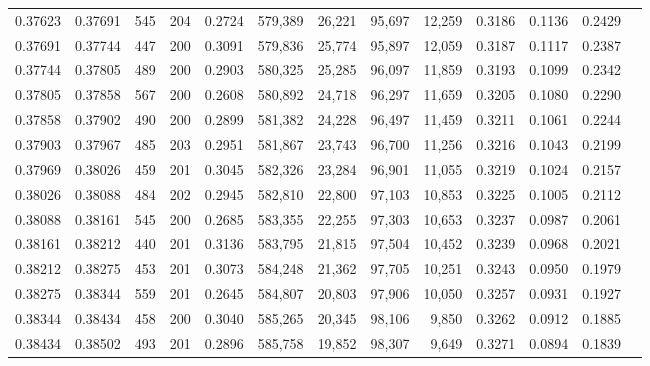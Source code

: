 \begin{tabular}{rrrrrrrrrrrrr}
0.37623 & 0.37691 &   545 & 204 &                                     0.2724 & 579,389 &  26,221 &  95,697 &  12,259 & 0.3186 & 0.1136 & 0.2429 \\
0.37691 & 0.37744 &   447 & 200 &                                     0.3091 & 579,836 &  25,774 &  95,897 &  12,059 & 0.3187 & 0.1117 & 0.2387 \\
0.37744 & 0.37805 &   489 & 200 &                                     0.2903 & 580,325 &  25,285 &  96,097 &  11,859 & 0.3193 & 0.1099 & 0.2342 \\
0.37805 & 0.37858 &   567 & 200 &                                     0.2608 & 580,892 &  24,718 &  96,297 &  11,659 & 0.3205 & 0.1080 & 0.2290 \\
0.37858 & 0.37902 &   490 & 200 &                                     0.2899 & 581,382 &  24,228 &  96,497 &  11,459 & 0.3211 & 0.1061 & 0.2244 \\
0.37903 & 0.37967 &   485 & 203 &                                     0.2951 & 581,867 &  23,743 &  96,700 &  11,256 & 0.3216 & 0.1043 & 0.2199 \\
0.37969 & 0.38026 &   459 & 201 &                                     0.3045 & 582,326 &  23,284 &  96,901 &  11,055 & 0.3219 & 0.1024 & 0.2157 \\
0.38026 & 0.38088 &   484 & 202 &                                     0.2945 & 582,810 &  22,800 &  97,103 &  10,853 & 0.3225 & 0.1005 & 0.2112 \\
0.38088 & 0.38161 &   545 & 200 &                                     0.2685 & 583,355 &  22,255 &  97,303 &  10,653 & 0.3237 & 0.0987 & 0.2061 \\
0.38161 & 0.38212 &   440 & 201 &                                     0.3136 & 583,795 &  21,815 &  97,504 &  10,452 & 0.3239 & 0.0968 & 0.2021 \\
0.38212 & 0.38275 &   453 & 201 &                                     0.3073 & 584,248 &  21,362 &  97,705 &  10,251 & 0.3243 & 0.0950 & 0.1979 \\
0.38275 & 0.38344 &   559 & 201 &                                     0.2645 & 584,807 &  20,803 &  97,906 &  10,050 & 0.3257 & 0.0931 & 0.1927 \\
0.38344 & 0.38434 &   458 & 200 &                                     0.3040 & 585,265 &  20,345 &  98,106 &   9,850 & 0.3262 & 0.0912 & 0.1885 \\
0.38434 & 0.38502 &   493 & 201 &                                     0.2896 & 585,758 &  19,852 &  98,307 &   9,649 & 0.3271 & 0.0894 & 0.1839 \\

\end{tabular}
